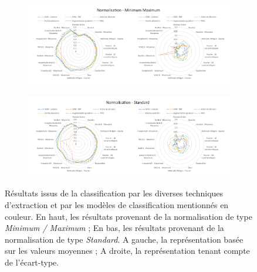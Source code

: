 \begin{figure}[H]
    \centering
    
    \begin{subfigure}{\textwidth}
      \includegraphics[width=\textwidth]{contents/chapter_5/resources/results_image_classification_mms.pdf}
    \end{subfigure}
    
    \begin{subfigure}{\textwidth}
      \includegraphics[width=\textwidth]{contents/chapter_5/resources/results_image_classification_ss.pdf}
    \end{subfigure}
    
    \caption{Résultats issus de la classification par les diverses techniques d'extraction et par les modèles de classification mentionnés en couleur. En haut, les résultats provenant de la normalisation de type \textit{Minimum / Maximum} ; En bas, les résultats provenant de la normalisation de type \textit{Standard}. A gauche, la représentation basée sur les valeurs moyennes ; A droite, la représentation tenant compte de l'écart-type.}
    \label{fig:results_image_classification}
\end{figure}\par

